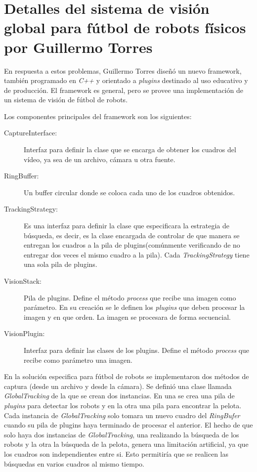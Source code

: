 
\section{Detalles del sistema de visión global para fútbol de robots físicos por
Guillermo Torres}

En respuesta a estos problemas, Guillermo Torres\cite{torres2014} diseñó un
nuevo framework, también programado en \emph{C++} y orientado a \emph{plugins}
destinado al uso educativo y de producción. El framework es general, pero se
provee una implementación de un sistema de visión de fútbol de robots.

Los componentes principales del framework son los siguientes:

\begin{description}

	\item[CaptureInterface:] Interfaz para definir la clase que se encarga
		de obtener los cuadros del vídeo, ya sea de un archivo, cámara u
		otra fuente.

	\item[RingBuffer:] Un buffer circular donde se coloca cada uno de los
		cuadros obtenidos.

	\item[TrackingStrategy:] Es una interfaz para definir la clase que
		especificara la estrategia de búsqueda, es decir, es la clase
		encargada de controlar de que manera se entregan los cuadros a
		la pila de plugins(comúnmente verificando de no entregar dos
		veces el mismo cuadro a la pila). Cada \emph{TrackingStrategy}
		tiene una sola pila de plugins.
	
	\item[VisionStack:] Pila de plugins. Define el método \emph{process} que
		recibe una imagen como parámetro. En su creación se le definen
		los \emph{plugins} que deben procesar la imagen y en que orden.
		La imagen se procesara de forma secuencial.

	\item[VisionPlugin:] Interfaz para definir las clases de los plugins.
		Define el método \emph{process} que recibe como parámetro una
		imagen.

\end{description}

En la solución especifica para fútbol de robots se implementaron dos métodos de
captura (desde un archivo y desde la cámara). Se definió una clase llamada
\emph{GlobalTracking} de la que se crean dos instancias. En una se crea una pila
de \emph{plugins} para detectar los robots y en la otra una pila para encontrar
la pelota. Cada instancia de \emph{GlobalTracking} solo tomara un nuevo cuadro
del \emph{RingBufer} cuando su pila de plugins haya terminado de procesar el
anterior. El hecho de que solo haya dos instancias de \emph{GlobalTracking}, una
realizando la búsqueda de los robots y la otra la búsqueda de la pelota, genera
una limitación artificial, ya que los cuadros son independientes entre si. Esto
permitiría que se realicen las búsquedas en varios cuadros al mismo tiempo.
